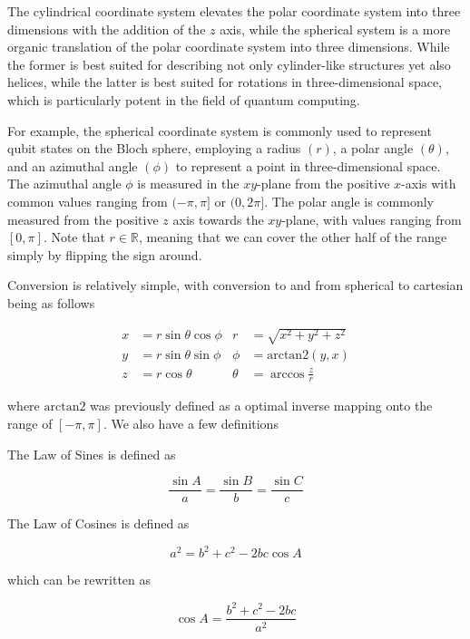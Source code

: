 \documentclass[12pt]{article}
\begin{document}
The cylindrical coordinate system elevates the polar coordinate system into three dimensions with the addition of the $z$ axis, while the spherical system is a more organic translation of the polar coordinate system into three dimensions. While the former is best suited for describing not only cylinder-like structures yet also helices, while the latter is best suited for rotations in three-dimensional space, which is particularly potent in the field of quantum computing. 

For example, the spherical coordinate system is commonly used to represent qubit states on the Bloch sphere, employing a radius $(r)$, a polar angle $(\theta)$, and an azimuthal angle $(\phi)$ to represent a point in three-dimensional space. The azimuthal angle $\phi$ is measured in the $xy$-plane from the positive $x$-axis with common values ranging from $(-\pi, \pi]$ or $(0, 2\pi]$. The polar angle is commonly measured from the positive $z$ axis towards the $xy$-plane, with values ranging from $[0, \pi]$. Note that $r \in \mathbb{R}$, meaning that we can cover the other half of the range simply by flipping the sign around. 

Conversion is relatively simple, with conversion to and from spherical to cartesian being as follows

\begin{align*}
    x &= r \sin \theta \cos \phi &     r &= \sqrt{x^2 + y^2 + z^2} \\
    y &= r \sin \theta \sin \phi &     \phi &= \mathrm{arctan2} (y, x) \\
    z &= r \cos \theta &         \theta &= \arccos \frac{z}{r}
\end{align*}

where $\mathrm{arctan2}$ was previously defined as a optimal inverse mapping onto the range of $[- \pi, \pi]$. We also have a few definitions

\begin{definition}
    The Law of Sines is defined as 

    $$\frac{\sin A}{a} = \frac{\sin B}{b} = \frac{\sin C}{c}$$
\end{definition}

\begin{definition}
    The Law of Cosines is defined as 

    $$a^2 = b^2 + c^2 - 2bc \cos A$$

    which can be rewritten as 

    $$\cos A = \frac{b^2 + c^2 - 2bc}{a^2}$$
\end{definition}
\end{document}
